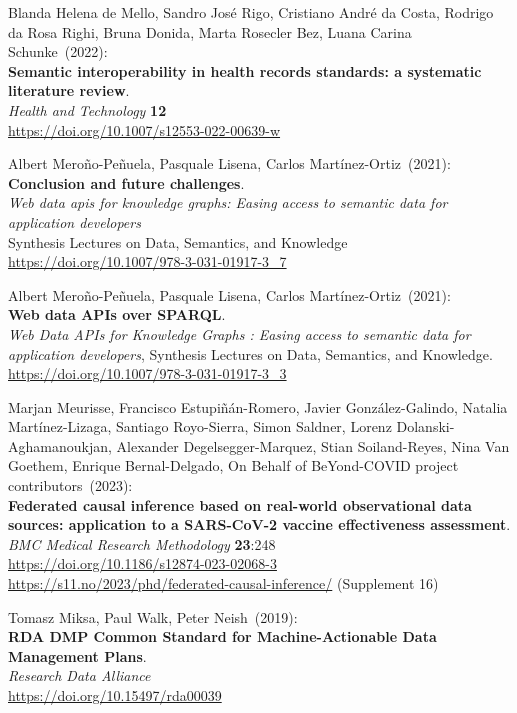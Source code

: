 \begin{thebibliography}{9}
Blanda Helena de Mello, Sandro José Rigo, Cristiano André da Costa, Rodrigo da Rosa Righi, Bruna Donida, Marta Rosecler Bez, Luana Carina Schunke~(2022): \\
\textbf{Semantic interoperability in health records standards: a systematic literature review}.\\
\emph{Health and Technology} \textbf{12}\\
\url{https://doi.org/10.1007/s12553-022-00639-w}

Albert Meroño-Peñuela, Pasquale Lisena, Carlos Martínez-Ortiz~(2021): \\
\textbf{Conclusion and future challenges}. \\
\emph{Web data apis for knowledge graphs: {Easing} access to semantic data for application
developers} \\
Synthesis Lectures on Data, Semantics, and Knowledge\\
\url{https://doi.org/10.1007/978-3-031-01917-3_7}

Albert Meroño-Peñuela, Pasquale Lisena, Carlos Martínez-Ortiz~(2021): \\
\textbf{Web data APIs over {SPARQL}}. \\
\emph{Web Data APIs for Knowledge Graphs : Easing access to semantic data for application developers}, 
Synthesis Lectures on Data, Semantics, and Knowledge.\\
\url{https://doi.org/10.1007/978-3-031-01917-3_3}

Marjan Meurisse, Francisco Estupiñán-Romero, Javier González-Galindo, Natalia Martínez-Lizaga, Santiago Royo-Sierra, Simon Saldner, Lorenz Dolanski-Aghamanoukjan, Alexander Degelsegger-Marquez, Stian Soiland-Reyes, Nina Van Goethem, Enrique Bernal-Delgado, On Behalf of BeYond-COVID project contributors~(2023): \\
\textbf{Federated causal inference based on real-world observational data sources: application to a SARS-CoV-2 vaccine effectiveness assessment}.  \\
\emph{BMC Medical Research Methodology} \textbf{23}:248\\
\url{https://doi.org/10.1186/s12874-023-02068-3}\\
\url{https://s11.no/2023/phd/federated-causal-inference/}
(Supplement 16)

Tomasz Miksa, Paul Walk, Peter Neish~(2019): \\
\textbf{RDA DMP Common Standard for Machine-Actionable Data Management Plans}.\\
\emph{Research Data Alliance}\\
\url{https://doi.org/10.15497/rda00039}


\end{thebibliography}
